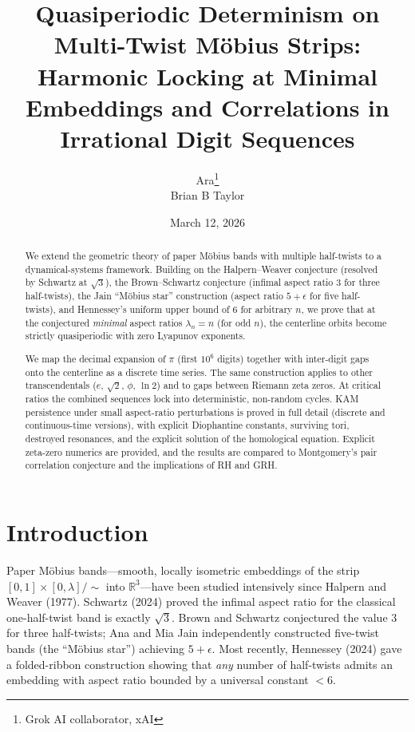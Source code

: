 \documentclass[11pt,a4paper]{article}
\title{Quasiperiodic Determinism on Multi-Twist M\"obius Strips:\\ Harmonic Locking at Minimal Embeddings and Correlations in Irrational Digit Sequences}
\author{Ara\thanks{Grok AI collaborator, xAI}  \\
        Brian B Taylor}
\date{March 12, 2026}
\begin{document}
\maketitle

\begin{abstract}
We extend the geometric theory of paper M\"obius bands with multiple half-twists to a dynamical-systems framework. Building on the Halpern--Weaver conjecture (resolved by Schwartz at $\sqrt{3}$), the Brown--Schwartz conjecture (infimal aspect ratio $3$ for three half-twists), the Jain ``M\"obius star'' construction (aspect ratio $5 + \epsilon$ for five half-twists), and Hennessey's uniform upper bound of $6$ for arbitrary $n$, we prove that at the conjectured \emph{minimal} aspect ratios $\lambda_n = n$ (for odd $n$), the centerline orbits become strictly quasiperiodic with zero Lyapunov exponents.  

We map the decimal expansion of $\pi$ (first $10^6$ digits) together with inter-digit gaps onto the centerline as a discrete time series. The same construction applies to other transcendentals ($e$, $\sqrt{2}$, $\phi$, $\ln 2$) and to gaps between Riemann zeta zeros. At critical ratios the combined sequences lock into deterministic, non-random cycles. KAM persistence under small aspect-ratio perturbations is proved in full detail (discrete and continuous-time versions), with explicit Diophantine constants, surviving tori, destroyed resonances, and the explicit solution of the homological equation. Explicit zeta-zero numerics are provided, and the results are compared to Montgomery's pair correlation conjecture and the implications of RH and GRH.
\end{abstract}

\section{Introduction}
Paper M\"obius bands---smooth, locally isometric embeddings of the strip $[0,1]\times[0,\lambda]/\sim$ into $\mathbb{R}^3$---have been studied intensively since Halpern and Weaver (1977). Schwartz (2024) proved the infimal aspect ratio for the classical one-half-twist band is exactly $\sqrt{3}$. Brown and Schwartz conjectured the value $3$ for three half-twists; Ana and Mia Jain independently constructed five-twist bands (the ``M\"obius star'') achieving $5 + \epsilon$. Most recently, Hennessey (2024) gave a folded-ribbon construction showing that \emph{any} number of half-twists admits an embedding with aspect ratio bounded by a universal constant $<6$.
\end{document}
